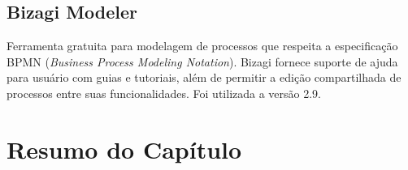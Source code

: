 \subsection{Bizagi Modeler}
Ferramenta gratuita para modelagem de processos que respeita a especificação BPMN (\textit{Business Process Modeling Notation}). Bizagi fornece suporte de ajuda para usuário com guias e tutoriais, além de permitir a edição compartilhada de processos entre suas funcionalidades. Foi utilizada a versão 2.9.

\section{Resumo do Capítulo}